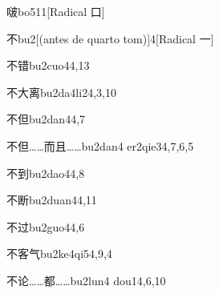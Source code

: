 \begin{verbete}{啵}{bo5}{11}[Radical 口]
\end{verbete}

\begin{verbete}{不}{bu2}[(antes de quarto tom)]{4}[Radical 一]
\end{verbete}

\begin{verbete}{不错}{bu2cuo4}{4,13}
\end{verbete}

\begin{verbete}{不大离}{bu2da4li2}{4,3,10}
\end{verbete}

\begin{verbete}{不但}{bu2dan4}{4,7}
\end{verbete}

\begin{verbete}{不但……而且……}{bu2dan4 er2qie3}{4,7,6,5}
\end{verbete}

\begin{verbete}{不到}{bu2dao4}{4,8}
\end{verbete}

\begin{verbete}{不断}{bu2duan4}{4,11}
\end{verbete}

\begin{verbete}{不过}{bu2guo4}{4,6}
\end{verbete}

\begin{verbete}{不客气}{bu2ke4qi5}{4,9,4}
\end{verbete}

\begin{verbete}{不论……都……}{bu2lun4 dou1}{4,6,10}
\end{verbete}

